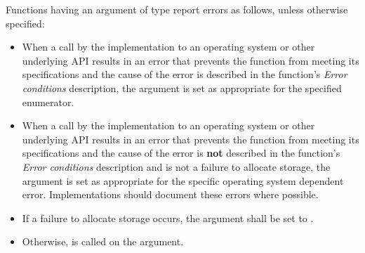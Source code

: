 \pnum
Functions having an argument of type  report errors as follows, unless otherwise specified:

\begin{itemize}
\item When a call by the implementation to an operating system or other underlying API results in an error that prevents the function from meeting its specifications and the cause of the error is described in the function's \textit{Error conditions} description, the  argument is set as appropriate for the specified enumerator.

\item When a call by the implementation to an operating system or other underlying API results in an error that prevents the function from meeting its specifications and the cause of the error is \textbf{not} described in the function's \textit{Error conditions} description and is not a failure to allocate storage, the  argument is set as appropriate for the specific operating system dependent error. Implementations should document these errors where possible.

\item If a failure to allocate storage occurs, the  argument shall be set to .

\item Otherwise,  is called on the  argument.
\end{itemize}
